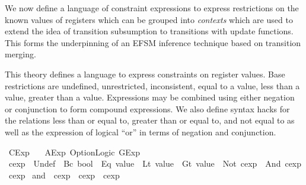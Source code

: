 %
\begin{isabellebody}%
%
%
\isadelimdocument
%
\endisadelimdocument
%
\isatagdocument
%
\isamarkuptrue%
%
\endisatagdocument
{\isafolddocument}%
%
\isadelimdocument
%
\endisadelimdocument
%
\begin{isamarkuptext}%
We now define a language of constraint expressions to express restrictions on the known values of
registers which can be grouped into \emph{contexts} which are used to extend the idea of transition
subsumption \cite{lorenzoli2008} to transitions with update functions. This forms the
underpinning of an EFSM inference technique based on transition merging.%
\end{isamarkuptext}\isamarkuptrue%
%
\isadelimdocument
%
\endisadelimdocument
%
\isatagdocument
%
\isamarkuptrue%
%
\endisatagdocument
{\isafolddocument}%
%
\isadelimdocument
%
\endisadelimdocument
%
\begin{isamarkuptext}%
This theory defines a language to express constraints on register values. Base restrictions are
undefined, unrestricted, inconsistent, equal to a value, less than a value, greater than a value.
Expressions may be combined using either negation or conjunction to form compound expressions. We
also define syntax hacks for the relations less than or equal to, greater than or equal to, and
not equal to as well as the expression of logical ``or'' in terms of negation and conjunction.%
\end{isamarkuptext}\isamarkuptrue%
%
\isadelimtheory
%
\endisadelimtheory
%
\isatagtheory
{}\isamarkupfalse%
\ CExp\isanewline
\ \ \ AExp\ Option{\isacharunderscore}Logic\ GExp\isanewline
{}%
\endisatagtheory
{\isafoldtheory}%
%
\isadelimtheory
%
\endisadelimtheory
\isanewline
\isanewline
{}\isamarkupfalse%
\ cexp\ {\isacharequal}\ Undef\ {\isacharbar}\ Bc\ bool\ {\isacharbar}\ Eq\ {\isachardoublequoteopen}value{\isachardoublequoteclose}\ {\isacharbar}\ Lt\ {\isachardoublequoteopen}value{\isachardoublequoteclose}\ {\isacharbar}\ Gt\ {\isachardoublequoteopen}value{\isachardoublequoteclose}\ {\isacharbar}\ Not\ cexp\ {\isacharbar}\ And\ cexp\ cexp\isanewline
\isanewline
{}\isamarkupfalse%
\ {\isachardoublequoteopen}and{\isachardoublequoteclose}\ {\isacharcolon}{\isacharcolon}\ {\isachardoublequoteopen}cexp\ {\isasymRightarrow}\ cexp\ {\isasymRightarrow}\ cexp{\isachardoublequoteclose}\ \isanewline

\end{isabellebody}
